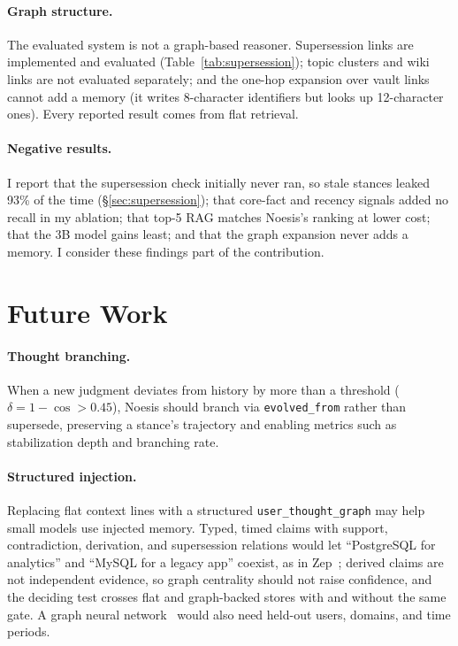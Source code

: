 \documentclass[11pt]{article}
\begin{document}
\paragraph{Graph structure.} The evaluated system is not a graph-based
reasoner. Supersession links are implemented and evaluated
(Table~\ref{tab:supersession}); topic clusters and wiki links are not
evaluated separately; and the one-hop expansion over vault links cannot add a
memory (it writes 8-character identifiers but looks up 12-character ones).
Every reported result comes from flat retrieval.

\paragraph{Negative results.} I report that the supersession check initially
never ran, so stale stances leaked 93\% of the time
(\S\ref{sec:supersession}); that core-fact and recency signals added no recall
in my ablation; that top-5 RAG matches Noesis's ranking at lower cost; that
the 3B model gains least; and that the graph expansion never adds a memory. I
consider these findings part of the contribution.

\section{Future Work}
\label{sec:future}

\paragraph{Thought branching.} When a new judgment deviates from history by
more than a threshold ($\delta = 1-\cos > 0.45$), Noesis should branch via
\texttt{evolved\_from} rather than supersede, preserving a stance's trajectory
and enabling metrics such as stabilization depth and branching rate.

\paragraph{Structured injection.} Replacing flat context lines with a
structured \texttt{user\_thought\_graph} may help small models use injected
memory. Typed, timed claims with support, contradiction, derivation, and
supersession relations would let ``PostgreSQL for analytics'' and ``MySQL for
a legacy app'' coexist, as in Zep~\citep{zep}; derived claims are not
independent evidence, so graph centrality should not raise confidence, and the
deciding test crosses flat and graph-backed stores with and without the same
gate. A graph neural network~\citep{battaglia2018relational} would also need
held-out users, domains, and time periods.
\end{document}
